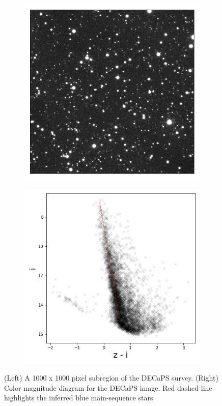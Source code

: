 \begin{figure}[!htb]
    \centering
    \begin{subfigure}[T]{0.45\textwidth}
    \centering
    \includegraphics[width=\textwidth]{./figures/decaps/example_subimage1000_decaps.png}
    \end{subfigure}
    \hfill
    \begin{subfigure}[T]{0.5\textwidth}
    \centering
    \includegraphics[width=\textwidth]{./figures/decaps/decaps_cmd.png}
    \end{subfigure}
    \caption{(Left) A 1000 x 1000 pixel subregion of the DECaPS survey. 
    (Right) Color magnitude diagram for the DECaPS image. Red dashed line highlights
    the inferred blue main-sequence stars}
    \label{fig:decaps}
\end{figure}



